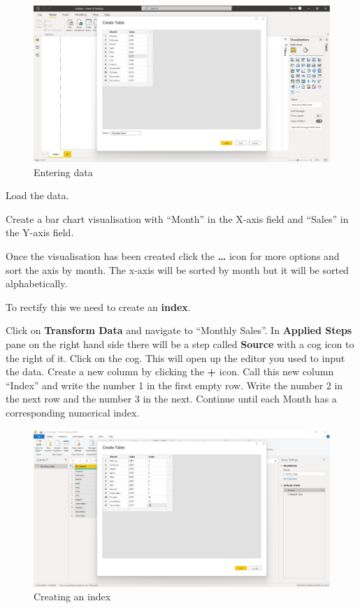 \documentclass[
]{book}
\begin{document}
\begin{figure}
\centering
\includegraphics{bi14.png}
\caption{Entering data}
\end{figure}

Load the data.

Create a bar chart visualisation with ``Month'' in the X-axis field and ``Sales'' in the Y-axis field.

Once the visualisation has been created click the \textbf{\ldots{}} icon for more options and sort the axis by month. The x-axis will be sorted by month but it will be sorted alphabetically.

To rectify this we need to create an \textbf{index}.

Click on \textbf{Transform Data} and navigate to ``Monthly Sales''. In \textbf{Applied Steps} pane on the right hand side there will be a step called \textbf{Source} with a cog icon to the right of it. Click on the cog. This will open up the editor you used to input the data. Create a new column by clicking the \textbf{+} icon. Call this new column ``Index'' and write the number 1 in the first empty row. Write the number 2 in the next row and the number 3 in the next. Continue until each Month has a corresponding numerical index.

\begin{figure}
\centering
\includegraphics{bi15.jpg}
\caption{Creating an index}
\end{figure}
\end{document}
